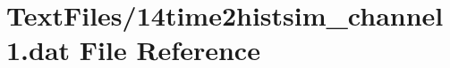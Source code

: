 \hypertarget{14time2histsim__channel1_8dat}{}\section{Text\+Files/14time2histsim\+\_\+channel1.dat File Reference}
\label{14time2histsim__channel1_8dat}
